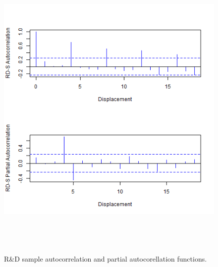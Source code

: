 \begin{figure}[H] 
\centering
\includegraphics[width=5in, height=6in]{figures/rdsales-acf}
\captionsetup{justification=centering, width=.95\textwidth} 
\caption{\footnotesize R\&D sample autocorrelation and partial autocorellation functions.} \label{rd-acf}
\end{figure} 
 \newpage

